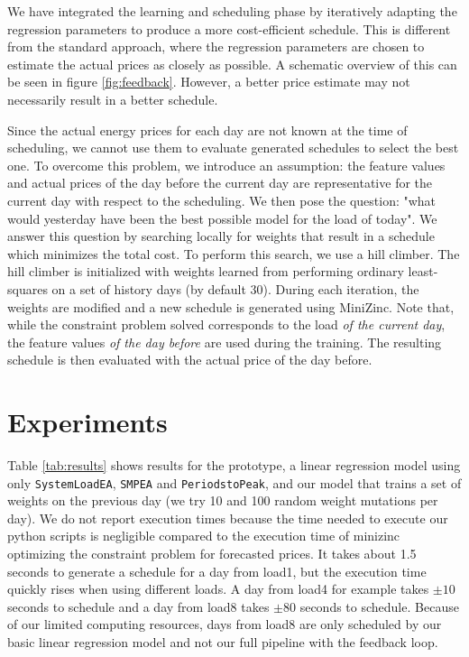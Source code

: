 \documentclass{article}
\begin{document}
We have integrated the learning and scheduling phase by iteratively adapting the regression parameters to produce a more cost-efficient schedule. This is different from the standard approach, where the regression parameters are chosen to estimate the actual prices as closely as possible. A schematic overview of this can be seen in figure \ref{fig:feedback}. However, a better price estimate may not necessarily result in a better schedule\cite{ifrim2012properties}.

Since the actual energy prices for each day are not known at the time of scheduling, we cannot use them to evaluate generated schedules to select the best one. To overcome this problem, we introduce an assumption: the feature values and actual prices of the day before the current day are representative for the current day with respect to the scheduling. We then pose the question: "what would yesterday have been the best possible model for the load of today". We answer this question by searching locally for weights that result in a schedule which minimizes the total cost. To perform this search, we use a hill climber. The hill climber is initialized with weights learned from performing ordinary least-squares on a set of history days (by default 30). During each iteration, the weights are modified and a new schedule is generated using MiniZinc. Note that, while the constraint problem solved corresponds to the load \emph{of the current day}, the feature values \emph{of the day before} are used during the training. The resulting schedule is then evaluated with the actual price of the day before. 

\section{Experiments}
Table \ref{tab:results} shows results for the prototype, a linear regression model using only \verb|SystemLoadEA|, \verb|SMPEA| and \verb|PeriodstoPeak|, and our model that trains a set of weights on the previous day (we try 10 and 100 random weight mutations per day). We do not report execution times because the time needed to execute our python scripts is negligible compared to the execution time of minizinc optimizing the constraint problem for forecasted prices. It takes about 1.5 seconds to generate a schedule for a day from load1, but the execution time quickly rises when using different loads. A day from load4 for example takes $\pm 10$ seconds to schedule and a day from load8 takes $\pm 80$ seconds to schedule. Because of our limited computing resources, days from load8 are only scheduled by our basic linear regression model and not our full pipeline with the feedback loop.
\end{document}
